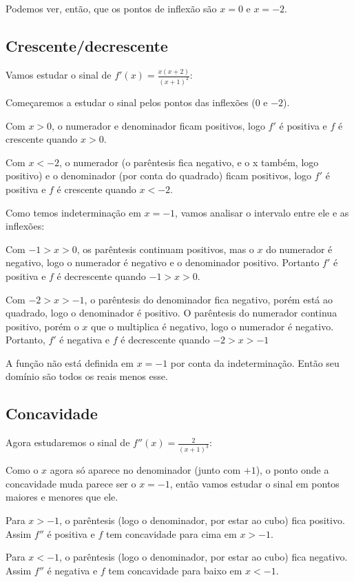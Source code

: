 \documentclass[12pt]{article}
\theoremstyle{definition}
\begin{document}
Podemos ver, então, que os pontos de inflexão são \(x=0\) e \(x=-2\).
\subsection{Crescente/decrescente}
Vamos estudar o sinal de \(f'(x) = \frac{x(x+2)}{{(x+1)}^2}\):

Começaremos a estudar o sinal pelos pontos das inflexões (\(0\) e \(-2\)).

Com \(x > 0\), o numerador e denominador ficam positivos, logo \(f'\) é positiva e \(f\) é crescente quando \(x>0\).

Com \(x < -2\), o numerador (o parêntesis fica negativo, e o x também, logo positivo) e o denominador (por conta do quadrado) ficam positivos, logo \(f'\) é positiva e \(f\) é crescente quando \(x< -2\).

Como temos indeterminação em \(x=-1\), vamos analisar o intervalo entre ele e as inflexões:

Com \(-1 > x > 0\), os parêntesis continuam positivos, mas o \(x\) do numerador é negativo, logo o numerador é negativo e o denominador positivo. Portanto \(f'\) é positiva e \(f\) é decrescente quando \(-1 > x > 0\).

Com \(-2 > x > -1\), o parêntesis do denominador fica negativo, porém está ao quadrado, logo o denominador é positivo. O parêntesis do numerador continua positivo, porém o \(x\) que o multiplica é negativo, logo o numerador é negativo. Portanto, \(f'\) é negativa e \(f\) é decrescente quando \(-2 > x > -1\)

A função não está definida em \(x = -1\) por conta da indeterminação. Então seu domínio são todos os reais menos esse.
\subsection{Concavidade}
Agora estudaremos o sinal de \(f''(x) = \frac{2}{{(x+1)}^3}\):

Como o \(x\) agora só aparece no denominador (junto com \(+1\)), o ponto onde a concavidade muda parece ser o \(x=-1\), então vamos estudar o sinal em pontos maiores e menores que ele.

Para \(x > -1\), o parêntesis (logo o denominador, por estar ao cubo) fica positivo. Assim \(f''\) é positiva e \(f\) tem concavidade para cima em \(x > -1\).

Para \(x < -1\), o parêntesis (logo o denominador, por estar ao cubo) fica negativo. Assim \(f''\) é negativa e \(f\) tem concavidade para baixo em \(x < -1\).
\end{document}
